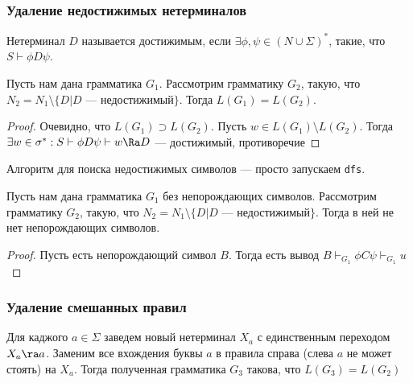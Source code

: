 
\subsubsection{Удаление недостижимых нетерминалов}

\begin{definition}
    Нетерминал \(D\) называется достижимым, если \(\exists \phi, \psi \in (N \cup \Sigma)^*\), такие, что \(S \vdash \phi D\psi\).
\end{definition}

\begin{proposition}
    Пусть нам дана грамматика \(G_1\). Рассмотрим грамматику \(G_2\), такую, что \(N_2 = N_1 \setminus \{D | D\text{ --- недостижимый}\}\). Тогда \(L(G_1) = L(G_2)\).
\end{proposition}
\begin{proof}
    Очевидно, что \(L(G_1) \supset L(G_2)\). Пусть \(w \in L(G_1) \setminus L(G_2)\). Тогда \(\exists w \in \sigma^*: S \vdash \phi D \psi \vdash w \Ra D\) --- достижимый, противоречие
\end{proof}

\begin{note}
    Алгоритм для поиска недостижимых символов --- просто запускаем \texttt{dfs}.
\end{note}

\begin{proposition}
    Пусть нам дана грамматика \(G_1\) без непорождающих символов. Рассмотрим грамматику \(G_2\), такую, что \(N_2 = N_1 \setminus \{D | D\text{ --- недостижимый}\}\). Тогда в ней не нет непорождающих символов.
\end{proposition}
\begin{proof}
    Пусть есть непорождающий символ \(B\). Тогда есть вывод \(B \vdash_{G_1} \phi C \psi \vdash_{G_1} u\)
\end{proof}

\subsubsection{Удаление смешанных правил}

\begin{exercise}
    Для каджого \(a \in \Sigma\) заведем новый нетерминал \(X_a\) с единственным переходом \(X_a \ra a\). Заменим все вхождения буквы \(a\) в правила справа (слева \(a\) не может стоять) на \(X_a\). Тогда полученная грамматика \(G_3\) такова, что \(L(G_3) = L(G_2)\)
\end{exercise}

